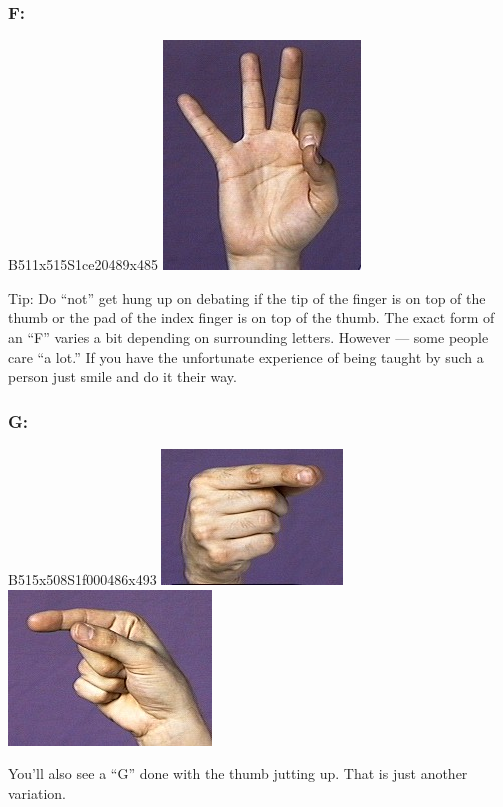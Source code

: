 \documentclass{article}
\begin{document}
\subsubsection{F:}

B511x515S1ce20489x485
\includegraphics[scale=0.5]{images/f.jpg}

Tip:
Do ``not'' get hung up on debating if the tip of the finger is on top of the thumb or the pad of the index finger is on top of the thumb.
The exact form of an ``F'' varies a bit depending on surrounding letters.
However --- some people care ``a lot.''
If you have the unfortunate experience of being taught by such a person just smile and do it their way.

\subsubsection{G:}

B515x508S1f000486x493
\includegraphics[scale=0.5]{images/g1.jpg}
\includegraphics[scale=0.5]{images/g2.jpg}

You'll also see a ``G'' done with the thumb jutting up.
That is just another variation.
\end{document}
